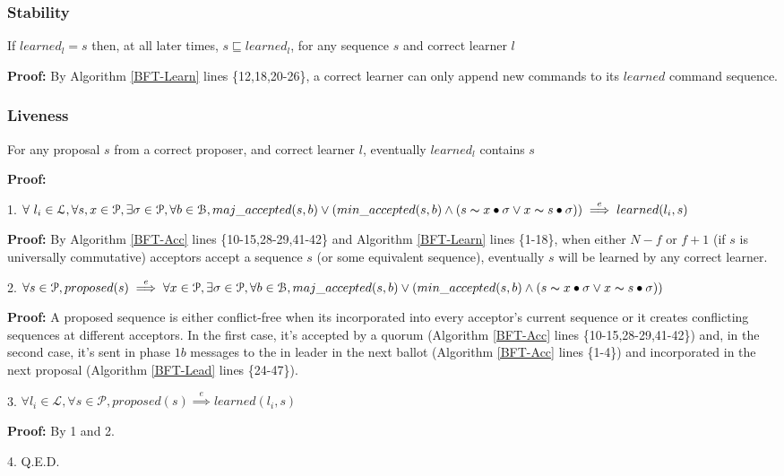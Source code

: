 \subsubsection{Stability}
\begin{theorem}
If $learned_l = s$ then, at all later times, $s \sqsubseteq learned_l$, for any sequence $s$ and correct learner $l$ \par
\end{theorem} 
\textbf{Proof:} By Algorithm \ref{BFT-Learn} lines \{12,18,20-26\}, a correct learner can only append new commands to its $learned$ command sequence.

\subsubsection{Liveness}
\begin{theorem}
For any proposal $s$ from a correct proposer, and correct learner $l$, eventually $learned_l$ contains $s$\par
\end{theorem} 
\parbox{\linewidth}{\textbf{Proof:}} \par
\parbox{\linewidth}{\strut1. $\forall\ l_i \in \mathcal{L},\forall s,x \in \mathcal{P}, \exists \sigma \in \mathcal{P}, \forall b \in \mathcal{B}, maj\_accepted(s,b) \lor (min\_accepted(s,b) \land  (s \thicksim x \bullet \sigma \lor x \thicksim s \bullet \sigma))\overset{e}{\implies} learned(l_i,s)$}\par
\indent\indent\parbox{\linewidth}{\strut\textbf{Proof:} By Algorithm \ref{BFT-Acc} lines \{10-15,28-29,41-42\} and Algorithm \ref{BFT-Learn} lines \{1-18\}, when either $N-f$ or $f+1$ (if $s$ is universally commutative) acceptors accept a sequence $s$ (or some equivalent sequence), eventually $s$ will be learned by any correct learner.}\par
\parbox{\linewidth}{\strut2. $\forall s \in \mathcal{P}, proposed(s) \overset{e}{\implies} \forall x \in \mathcal{P}, \exists \sigma \in \mathcal{P}, \forall b \in \mathcal{B}, maj\_accepted(s,b) \lor (min\_accepted(s,b) \land  (s \thicksim x \bullet \sigma \lor x \thicksim s \bullet \sigma))$} \par
\indent\indent\parbox{\linewidth}{\strut\textbf{Proof:} A proposed sequence is either conflict-free when its incorporated into every acceptor's current sequence or it creates conflicting sequences at different acceptors. In the first case, it's accepted by a quorum (Algorithm \ref{BFT-Acc} lines \{10-15,28-29,41-42\}) and, in the second case, it's sent in phase $1b$ messages to the in leader in the next ballot (Algorithm \ref{BFT-Acc} lines \{1-4\}) and incorporated in the next proposal (Algorithm \ref{BFT-Lead} lines \{24-47\}).} \par
\parbox{\linewidth}{\strut3. $\forall l_i \in \mathcal{L}, \forall s \in \mathcal{P}, proposed(s) \overset{e}{\implies} learned(l_i,s)$} \par
\indent\indent\parbox{\linewidth}{\strut\textbf{Proof:} By 1 and 2.} \par
\parbox{\linewidth}{\strut4. Q.E.D.}